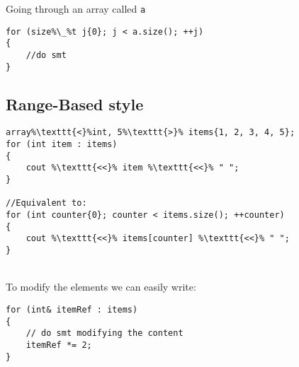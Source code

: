 \noindent Going through an array called \texttt{a}\\
\begin{minipage}{.5\textwidth}
\end{minipage}\hspace{0.72cm}
\begin{minipage}{.6\textwidth}
\vspace{0.1cm}
\begin{lstlisting}[frame=tlrb,numbers=none,mathescape=true,escapechar=\%,columns=flexible]
for (size%\_%t j{0}; j < a.size(); ++j)
{
    //do smt
}
\end{lstlisting}
\end{minipage}

\subsection{Range-Based style}

\begin{minipage}{.5\textwidth}
\end{minipage}\hspace{0.72cm}
\begin{minipage}{.6\textwidth}
\vspace{0.1cm}
\begin{lstlisting}[frame=tlrb,numbers=none,mathescape=true,escapechar=\%,columns=flexible]
array%\texttt{<}%int, 5%\texttt{>}% items{1, 2, 3, 4, 5};
for (int item : items)
{
    cout %\texttt{<<}% item %\texttt{<<}% " ";
}

//Equivalent to:
for (int counter{0}; counter < items.size(); ++counter) 
{
    cout %\texttt{<<}% items[counter] %\texttt{<<}% " ";
}
\end{lstlisting}
\end{minipage}
\\
\noindent To modify the elements we can easily write:\\
\begin{minipage}{.5\textwidth}
\end{minipage}\hspace{0.72cm}
\begin{minipage}{.6\textwidth}
\vspace{0.1cm}
\begin{lstlisting}[frame=tlrb,numbers=none,mathescape=true,escapechar=\%,columns=flexible]
for (int& itemRef : items)
{
    // do smt modifying the content
    itemRef *= 2;
}
\end{lstlisting}
\end{minipage}

